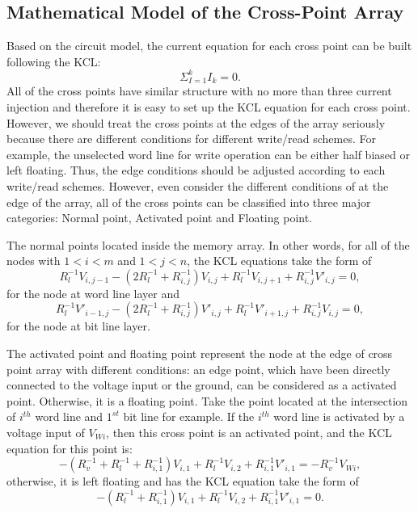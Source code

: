 \subsection{Mathematical Model of the Cross-Point Array}
Based on the circuit model, the current equation for each cross point can be built following the KCL:
\begin{equation}
  {\Sigma}_{I=1}^kI_k=0.
\end{equation}
All of the cross points have similar structure with no more than three current injection and therefore it is easy to set up the KCL equation for each cross point. However, we should treat the cross points at the edges of the array seriously because there are different conditions for different write/read schemes. For example, the unselected word line for write operation can be either half biased or left floating. Thus, the edge conditions should be adjusted according to each write/read schemes. However, even consider the different conditions of at the edge of the array, all of the cross points can be classified into three major categories: Normal point, Activated point and Floating point.

The normal points located inside the memory array. In other words, for all of the nodes with $1<i<m$ and $1<j<n$, the KCL equations take the form of
\begin{equation}\label{equ:KCL1}
R_l^{-1}V_{i,j-1} -(2R_l^{-1}+R_{i,j}^{-1})V_{i,j}+ R_l^{-1}V_{i,j+1}+R_{i,j}^{-1}V'_{i,j}=0,
\end{equation}
for the node at word line layer and
\begin{equation}\label{equ:KCL2}
R_l^{-1}V'_{i-1,j} -(2R_l^{-1}+R_{i,j}^{-1})V'_{i,j}+ R_l^{-1}V'_{i+1,j}+R_{i,j}^{-1}V_{i,j}=0,
\end{equation}
for the node at bit line layer.

The activated point and floating point represent the node at the edge of cross point array with different conditions: an edge point, which have been directly connected to the voltage input or the ground, can be considered as a activated point. Otherwise, it is a floating point. Take the point located at the intersection of $i^{th}$ word line and $1^{st}$ bit line for example. If the $i^{th}$ word line is activated by a voltage input of $V_{Wi}$, then this cross point is an activated point, and the KCL equation for this point is:
\begin{equation}\label{equ:KCL3}
-(R_v^{-1}+R_l^{-1}+R_{i,1}^{-1})V_{i,1}+ R_l^{-1}V_{i,2}+R_{i,1}^{-1}V'_{i,1}=-R_v^{-1}V_{Wi},
\end{equation}
otherwise, it is left floating and has the KCL equation take the form of
\begin{equation}\label{equ:KCL4}
-(R_l^{-1}+R_{i,1}^{-1})V_{i,1}+ R_l^{-1}V_{i,2}+R_{i,1}^{-1}V'_{i,1}=0.
\end{equation}

